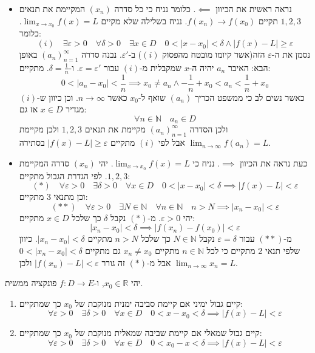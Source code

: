 \documentclass{tstextbook}
\begin{document}
\begin{itemize}
  \item נראה ראשית את הכיוון \(\impliedby\). כלומר נניח כי כל סדרה \((x_{n})\) המקיימת את תנאים \(1,2,3\) תקיים \(f(x_{n})\to f(x_{0})\).
נניח בשלילה שלא מקיים \(\lim_{ x \to x_{0} }f(x)=L\). כלומר:
$$(i)\quad \exists\varepsilon>0 \quad \forall \delta> 0 \quad \exists x \in D\quad  0 <\lvert x-x_{0} \rvert <\delta \land \lvert f(x)-L \rvert \geq \varepsilon$$
נסמן את ה-\(\varepsilon\) הזה(אשר קיומו מובטח מהפסוק \((i)\)) ב-\(\varepsilon'\). נבנה סדרה \((a_n)_{n=1}^\infty\) באופן הבא:
האיבר \(a_{n}\) יהיה ה-\(x\) שמקבלית מ-\((i)\) עבור \(\varepsilon=\varepsilon'\). ו-\(\delta=\frac{1}{n}\). מתקיים:
$$0<\lvert a_{n}-x_{0} \rvert <\frac{1}{n}\implies x_{0}\neq a_{n}\land -\frac{1}{n}+x_{0}<a_{n}<\frac{1}{n}+x_{0}$$
כאשר נשים לב כי ממשפט הכריך \((a_{n})\) שואף ל-\(x_{0}\) כאשר \(n\to \infty\). וכן כיוון ש-\((i)\) מגדיר \(x \in D\) אז גם:
$$\forall n \in \mathbb{N}\quad a_{n}\in D$$
ולכן הסדרה \((a_n)_{n=1}^\infty\) מקיימת את תנאים \(1,2,3\) ולכן מקיימת \(\lim_{ n \to \infty }f(a_{n})=L\) אבל לפי \((i)\) מתקיים \(\lvert f(x)-L \rvert\geq \varepsilon\) בסתירה.
  \item כעת נראה את הכיוון \(\implies\). נניח כי \(\lim_{ x \to x_{0} }f(x)=L\). יהי \((x_{n})\) סדרה המקיימת \(1,2,3\). לפי הגדרת הגבול מתקיים:
$$(*)\quad \forall \varepsilon>0\quad \exists \delta>0\quad \forall x \in D\quad 0<\lvert x-x_{0} \rvert <\delta\implies \lvert f(x)-L \rvert <\varepsilon$$
וכן מתנאי 3 מתקיים:
$$(* *)\quad \forall\varepsilon>0\quad \exists N \in \mathbb{N}\quad  \forall n \in \mathbb{N}\quad n>N\implies \lvert x_{n}-x_{0} \rvert <\varepsilon$$
יהי \(\varepsilon> 0\). מ-\((*)\) נקבל \(\delta\) כך שלכל \(x \in D\) מתקיים:
$$\lvert x_{n}-x_{0} \rvert <\delta\implies \lvert f(x_{n}) -f(x_{0})\rvert <\varepsilon$$
מ-\((* *)\) עבור \(\varepsilon = \delta\) נקבל \(N \in \mathbb{N}\) כך שלכל \(n> N\) מתקיים \(\lvert x_{n}-x_{0} \rvert<\delta\). כיוון שלפי תנאי 2 מתקיים כי לכל \(n \in \mathbb{N}\) מתקיים \(x_{n}\neq x_{0}\) גם מתקיים \(0<\lvert x_{n}-x_{0} \rvert<\delta\) אבל מ-\((*)\) זה גורר \(\lvert f(x_{n})-L \rvert<\varepsilon\) ולכן \(\lim_{ n \to \infty }x_{n}=L\).
\end{itemize}
\begin{definition}
יהי \(x_{0} \in \mathbb{R}\), ו-\(f:D\to E\) פונקציה ממשית.

  \begin{enumerate}
    \item קיים גבול ימיני אם קיימת סביבה ימנית מנוקבת של \(x_{0}\) כך שמתקיים: 
$$\forall \varepsilon > 0\quad \exists \delta>0\quad \forall x \in D \quad 0<x-x_{0}<\delta\implies \lvert f(x)-L \rvert <\varepsilon$$


    \item קיים גבול שמאלי אם קיימת שביבה שמאלית מנוקבת של \(x_{0}\) כך שמתקיים: 
$$\forall \varepsilon > 0\quad \exists \delta>0\quad \forall x \in D \quad 0<x_{0}-x<\delta\implies \lvert f(x)-L \rvert <\varepsilon$$


  \end{enumerate}
\end{definition}
\end{document}
